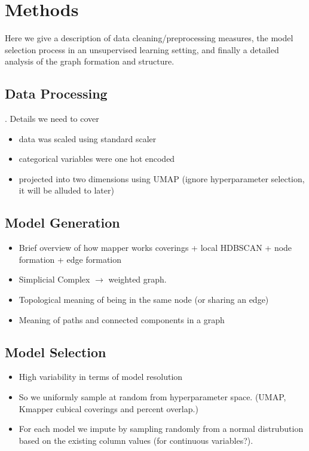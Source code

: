 \setlength{\parindent}{20pt}
\section{Methods}

Here we give a description of data cleaning/preprocessing measures, the model selection 
process in an unsupervised learning setting, and finally a detailed analysis of the 
graph formation and structure. 


\subsection{Data Processing}

. 
Details we need to cover
\begin{itemize}
    \item data was scaled using standard scaler 
    \item categorical variables were one hot encoded 
    \item projected into two dimensions using UMAP (ignore hyperparameter selection, 
    it will be alluded to later)
\end{itemize}


\subsection{Model Generation}

\begin{itemize}
    \item Brief overview of how mapper works coverings + local HDBSCAN + node formation + edge formation
    \item Simplicial Complex $\to$ weighted graph.
    \item Topological meaning of being in the same node (or sharing an edge)
    \item Meaning of paths and connected components in a graph 
\end{itemize}


\subsection{Model Selection}
\begin{itemize}
\item High variability in terms of model resolution
\item So we uniformly sample at random
from hyperparameter space. (UMAP, Kmapper cubical coverings and percent overlap.)
\item For each model we impute by sampling randomly from a normal distrubution based on
the existing column values (for continuous variables?).
\end{itemize}



